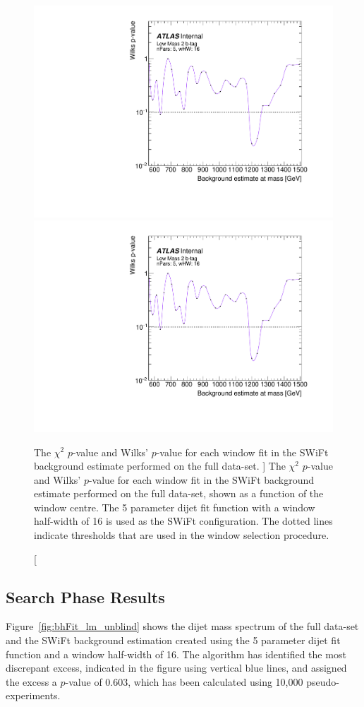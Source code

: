 \begin{figure}[!htb]
\captionsetup[subfigure]{aboveskip=0pt,justification=centering}
\centering
{} {
  \includegraphics[width=0.43\linewidth, angle=0,page=4]{figs/Dibjet/LowMass/FitStudy_min566/windowSel_unblind_just16.pdf}
}\hspace{-5mm}
 {
  \includegraphics[width=0.43\linewidth, angle=0,page=1]{figs/Dibjet/LowMass/FitStudy_min566/windowSel_unblind_just16.pdf}
}
\vspace{1pt}
\caption
    [ The  $\chi^{2}$ \mbox{$p$-value} and Wilks' \mbox{$p$-value} for each window fit in the SWiFt background estimate
      performed on the full \lm{} data-set.
    ]
    {\label{fig:windowSel_unblind_just16}
      The  $\chi^{2}$ \mbox{$p$-value} and Wilks' \mbox{$p$-value} for each window fit in the SWiFt background estimate
      performed on the full \lm{} data-set, shown as a function of the window centre.
      The 5 parameter dijet fit function with a window half-width of 16 is used as the SWiFt configuration.
      The dotted lines indicate thresholds that are used in the window selection procedure.
}
\end{figure}

\FloatBarrier
\clearpage

\subsection{Search Phase Results}
\label{sec:bkg-full_results}

Figure~\ref{fig:bhFit_lm_unblind} shows the dijet mass spectrum of the full \lm{} data-set
and the SWiFt background estimation created using the 5 parameter dijet fit function and a window half-width of 16.
The \bh{} algorithm has identified the most discrepant excess, indicated in the figure using vertical blue lines,
and assigned the excess a \mbox{$p$-value} of 0.603, which has been calculated using 10,000 pseudo-experiments.

